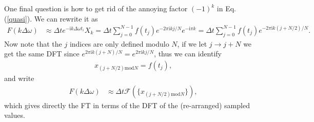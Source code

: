 \documentclass[11pt,letterpaper]{article}
\newcommand{\ii}{\mathrm{i}}
\newcommand{\eq}[1]{\begin{align}#1\end{align}}
\begin{document}
One final question is how to get rid of the annoying factor $(-1)^k$ in Eq. (\ref{quasi}). We can rewrite it as
\eq{
F(k \Delta \omega)&\approx \Delta t e^{-\ii k \Delta \omega t_i} X_k=\Delta t \sum_{j=0}^{N-1} f(t_j) e^{-2 \pi \ii k  j/N} e^{-\ii \pi k }=\Delta t \sum_{j=0}^{N-1} f(t_j) e^{-2 \pi \ii k  (j+N/2)/N}.
}
Now note that the $j$ indices are only defined modulo $N$, if we let $j \to j+N$ we get the same DFT since $e^{2 \pi \ii k(j+N)/N}=e^{2 \pi \ii k j /N}$, thus we can identify
\eq{
x_{(j+N/2) \text{mod} N} = f(t_j),
} 
and write
\eq{
F(k \Delta \omega)&\approx \Delta t \mathcal{F}\left(\{x_{(j+N/2) \text{mod} N} \}\right),
}
which gives directly the FT in terms of the DFT of the (re-arranged) sampled values.
\end{document}
